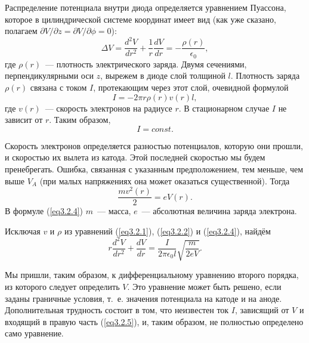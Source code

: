 Распределение потенциала внутри диода определяется уравнением Пуассона, которое в цилиндрической системе координат имеет вид (как уже сказано, полагаем $\partial V/\partial z=\partial V/\partial\phi=0$):
\begin{equation}
\Delta V=\frac{d^2 V}{dr^2}+\frac{1}{r}\frac{dV}{dr}=-\frac{\rho(r)}{\epsilon_0},
\label{eq3.2.1}
\end{equation}
где $\rho(r)$~--- плотность электрического заряда. Двумя сечениями, перпендикулярными оси $z$, вырежем в диоде слой
толщиной $l$. Плотность заряда $\rho(r)$ связана с током $I$, протекающим через этот слой, очевидной формулой
\begin{equation}
I=-2\pi r\rho(r)v(r)l,
\label{eq3.2.2}
\end{equation}
где $v(r)$~--- скорость электронов на радиусе $r$. В стационарном случае $I$ не зависит от $r$. Таким образом,
\begin{equation}
I=const.
\label{eq3.2.3}
\end{equation}

Скорость электронов определяется разностью потенциалов, которую они прошли, и скоростью их вылета из катода. Этой
последней скоростью мы будем пренебрегать. Ошибка, связанная с указанным предположением, тем меньше, чем выше $V_A$ (при малых напряжениях она может оказаться существенной). Тогда
\begin{equation}
\frac{mv^2(r)}{2}=eV(r).
\label{eq3.2.4}
\end{equation}
В формуле (\ref{eq3.2.4}) $m$~--- масса, $e$~--- абсолютная величина заряда электрона.

Исключая $v$ и $\rho$ из уравнений (\ref{eq3.2.1}), (\ref{eq3.2.2}) и (\ref{eq3.2.4}), найдём
\begin{equation}
r\frac{d^2V}{dr^2}+\frac{dV}{dr}=\frac{I}{2\pi\epsilon_0l}\sqrt{\frac{m}{2eV}}.
\label{eq3.2.5}
\end{equation}

Мы пришли, таким образом, к дифференциальному уравнению второго порядка, из которого следует определить $V$. Это
уравнение может быть решено, если заданы граничные условия, т.~е. значения потенциала на катоде и на аноде.
Дополнительная трудность состоит в том, что неизвестен ток $I$, зависящий от $V$ и входящий в правую часть (\ref{eq3.2.5}), и, таким образом, не полностью определено само уравнение.

